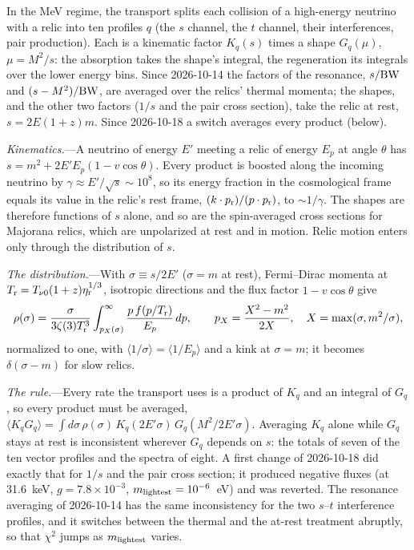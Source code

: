 \documentclass[11pt,a4paper]{article}
\begin{document}
In the MeV regime, the transport splits each collision of a high-energy neutrino with a relic into
ten profiles $q$ (the $s$ channel, the $t$ channel, their interferences, pair production). Each is
a kinematic factor $K_q(s)$ times a shape $G_q(\mu)$, $\mu = M^2/s$: the absorption takes the
shape's integral, the regeneration its integrals over the lower energy bins. Since 2026-10-14 the
factors of the resonance, $s/{\rm BW}$ and $(s-M^2)/{\rm BW}$, are averaged over the relics'
thermal momenta; the shapes, and the other two factors ($1/s$ and the pair cross section), take
the relic at rest, $s = 2E(1+z)m$. Since 2026-10-18 a switch averages every product (below).

\textit{Kinematics.}---A neutrino of energy $E'$ meeting a relic of energy $E_p$ at angle $\theta$
has $s = m^2 + 2E'E_p(1 - v\cos\theta)$. Every product is boosted along the incoming neutrino by
$\gamma \approx E'/\sqrt{s} \sim 10^8$, so its energy fraction in the cosmological frame equals its
value in the relic's rest frame, $(k\cdot p_{\rm r})/(p\cdot p_{\rm r})$, to $\sim\! 1/\gamma$. The
shapes are therefore functions of $s$ alone, and so are the spin-averaged cross sections for
Majorana relics, which are unpolarized at rest and in motion. Relic motion enters only through the
distribution of $s$.

\textit{The distribution.}---With $\sigma \equiv s/2E'$ ($\sigma = m$ at rest), Fermi--Dirac
momenta at $T_{\rm r} = T_{\nu 0}(1+z)\eta_{\rm r}^{1/3}$, isotropic directions and the flux factor
$1 - v\cos\theta$ give
\begin{equation}
\rho(\sigma) = \frac{\sigma}{3\zeta(3)T_{\rm r}^3}\int_{p_X(\sigma)}^\infty
\frac{p\, f(p/T_{\rm r})}{E_p}\,dp, \qquad p_X = \frac{X^2 - m^2}{2X}, \quad
X = \max(\sigma, m^2/\sigma),
\end{equation}
normalized to one, with $\langle 1/\sigma\rangle = \langle 1/E_p\rangle$ and a kink at
$\sigma = m$; it becomes $\delta(\sigma - m)$ for slow relics.

\textit{The rule.}---Every rate the transport uses is a product of $K_q$ and an integral of $G_q$,
so every product must be averaged,
$\langle K_q G_q\rangle = \int d\sigma\, \rho(\sigma)\, K_q(2E'\sigma)\, G_q(M^2/2E'\sigma)$.
Averaging $K_q$ alone while $G_q$ stays at rest is inconsistent wherever $G_q$ depends on $s$: the
totals of seven of the ten vector profiles and the spectra of eight. A first change of 2026-10-18
did exactly that for $1/s$ and the pair cross section; it produced negative fluxes (at 31.6~keV,
$g = 7.8\times10^{-3}$, $m_{\rm lightest} = 10^{-6}$~eV) and was reverted. The resonance averaging
of 2026-10-14 has the same inconsistency for the two $s$--$t$ interference profiles, and it
switches between the thermal and the at-rest treatment abruptly, so that $\chi^2$ jumps as
$m_{\rm lightest}$ varies.
\end{document}
